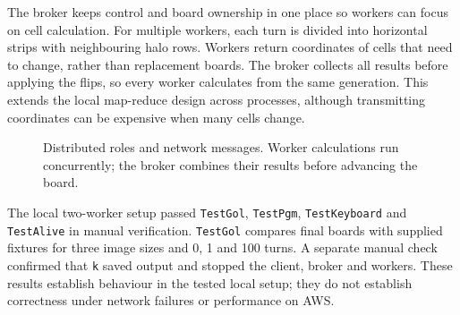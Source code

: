 \documentclass[10pt,a4paper,twocolumn]{article}
\begin{document}
The broker keeps control and board ownership in one place so workers can
focus on cell calculation. For multiple workers, each turn is divided into
horizontal strips with neighbouring halo rows. Workers return coordinates
of cells that need to change, rather than replacement boards. The broker
collects all results before applying the flips, so every worker calculates
from the same generation. This extends the local map-reduce design across
processes, although transmitting coordinates can be expensive when many
cells change.

\begin{figure}[t]
\centering
{}
\captionsetup{font=small}
\caption{Distributed roles and network messages. Worker calculations run
concurrently; the broker combines their results before advancing the board.}
\label{fig:distributed-flow}
\end{figure}

The local two-worker setup passed \texttt{TestGol}, \texttt{TestPgm},
\texttt{TestKeyboard} and \texttt{TestAlive} in manual verification.
\texttt{TestGol} compares final boards with supplied fixtures for three
image sizes and 0, 1 and 100 turns. A separate manual check confirmed that
\texttt{k} saved output and stopped the client, broker and workers.
These results establish behaviour in the tested local setup; they do not
establish correctness under network failures or performance on AWS.
\end{document}
